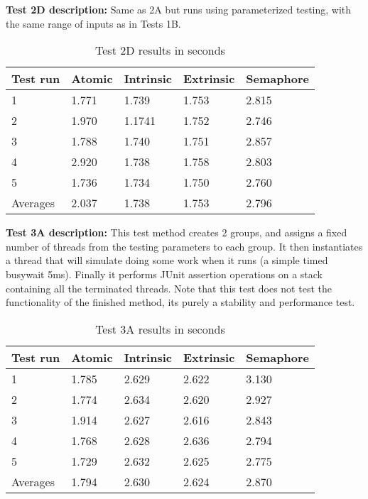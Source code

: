 \documentclass[11pt]{article}
\begin{document}
\textbf{Test 2D description:} Same as 2A but runs using parameterized testing, with the same range of inputs as in Tests 1B.\\


\begin{table}[H]
\centering
\caption{Test 2D results in seconds}
\label{tab:my-table}
\begin{tabular}{|l|l|l|l|l|}
\hline
Test run & Atomic & Intrinsic & Extrinsic & Semaphore \\ \hline
1        & 1.771  & 1.739     & 1.753     & 2.815     \\ \hline
2        & 1.970  & 1.1741     & 1.752     & 2.746     \\ \hline
3        & 1.788  & 1.740     & 1.751     & 2.857     \\ \hline
4        & 2.920  & 1.738     & 1.758     & 2.803     \\ \hline
5        & 1.736  & 1.734     & 1.750     & 2.760     \\ \hline
Averages & 2.037  & 1.738     & 1.753     & 2.796     \\ \hline
\end{tabular}
\end{table}


\textbf{Test 3A description:} This test method creates 2 groups, and assigns a fixed number of threads from the testing parameters to each group. It then instantiates a thread that will simulate doing some work when it runs (a simple timed busywait 5ms). Finally it performs JUnit assertion operations on a stack containing all the terminated threads. Note that this test does not test the functionality of the finished method, its purely a stability and performance test.\\ 

\begin{table}[H]
\centering
\caption{Test 3A results in seconds}
\label{tab:my-table}
\begin{tabular}{|l|l|l|l|l|}
\hline
Test run & Atomic & Intrinsic & Extrinsic & Semaphore \\ \hline
1        & 1.785  & 2.629     & 2.622     & 3.130     \\ \hline
2        & 1.774  & 2.634     & 2.620     & 2.927     \\ \hline
3        & 1.914  & 2.627     & 2.616     & 2.843     \\ \hline
4        & 1.768  & 2.628     & 2.636     & 2.794     \\ \hline
5        & 1.729  & 2.632     & 2.625     & 2.775     \\ \hline
Averages & 1.794  & 2.630     & 2.624     & 2.870     \\ \hline
\end{tabular}
\end{table}
\end{document}
